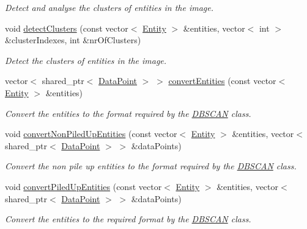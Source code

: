 \begin{DoxyCompactItemize}
\begin{DoxyCompactList}\small\item\em Detect and analyse the clusters of entities in the image. \end{DoxyCompactList}\item 
void \hyperlink{classmultiscale_1_1analysis_1_1ClusterDetector_a8c9c3ac0c3d8e924468a58f558984dda}{detect\-Clusters} (const vector$<$ \hyperlink{classmultiscale_1_1analysis_1_1Entity}{Entity} $>$ \&entities, vector$<$ int $>$ \&cluster\-Indexes, int \&nr\-Of\-Clusters)
\begin{DoxyCompactList}\small\item\em Detect the clusters of entities in the image. \end{DoxyCompactList}\item 
vector$<$ shared\-\_\-ptr$<$ \hyperlink{classmultiscale_1_1analysis_1_1DataPoint}{Data\-Point} $>$ $>$ \hyperlink{classmultiscale_1_1analysis_1_1ClusterDetector_aa45fe0a4a548b4d44407ee7f346e66d3}{convert\-Entities} (const vector$<$ \hyperlink{classmultiscale_1_1analysis_1_1Entity}{Entity} $>$ \&entities)
\begin{DoxyCompactList}\small\item\em Convert the entities to the format required by the \hyperlink{classmultiscale_1_1analysis_1_1DBSCAN}{D\-B\-S\-C\-A\-N} class. \end{DoxyCompactList}\item 
void \hyperlink{classmultiscale_1_1analysis_1_1ClusterDetector_a4b42b3de7411fe02c7871064497feef1}{convert\-Non\-Piled\-Up\-Entities} (const vector$<$ \hyperlink{classmultiscale_1_1analysis_1_1Entity}{Entity} $>$ \&entities, vector$<$ shared\-\_\-ptr$<$ \hyperlink{classmultiscale_1_1analysis_1_1DataPoint}{Data\-Point} $>$ $>$ \&data\-Points)
\begin{DoxyCompactList}\small\item\em Convert the non pile up entities to the format required by the \hyperlink{classmultiscale_1_1analysis_1_1DBSCAN}{D\-B\-S\-C\-A\-N} class. \end{DoxyCompactList}\item 
void \hyperlink{classmultiscale_1_1analysis_1_1ClusterDetector_a22ba21c341448af455111e718b058391}{convert\-Piled\-Up\-Entities} (const vector$<$ \hyperlink{classmultiscale_1_1analysis_1_1Entity}{Entity} $>$ \&entities, vector$<$ shared\-\_\-ptr$<$ \hyperlink{classmultiscale_1_1analysis_1_1DataPoint}{Data\-Point} $>$ $>$ \&data\-Points)
\begin{DoxyCompactList}\small\item\em Convert the entities to the required format by the \hyperlink{classmultiscale_1_1analysis_1_1DBSCAN}{D\-B\-S\-C\-A\-N} class. \end{DoxyCompactList}\item 

\end{DoxyCompactItemize}
